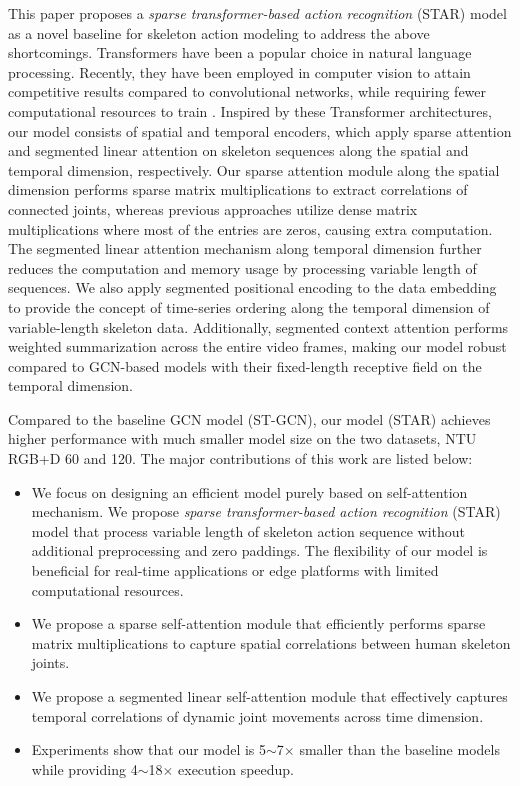 \documentclass[letterpaper]{article} %
\begin{document}
This paper proposes a \textit{sparse transformer-based action recognition} (STAR) model as a novel baseline for skeleton action modeling to address the above shortcomings. Transformers have been a popular choice in natural language processing. Recently, they have been employed in computer vision to attain competitive results compared to convolutional networks, while requiring fewer computational resources to train \cite{dosovitskiy2020image, huang2019ccnet}. Inspired by these Transformer architectures, our model consists of spatial and temporal encoders, which apply sparse attention and segmented linear attention on skeleton sequences along the spatial and temporal dimension, respectively.
Our sparse attention module along the spatial dimension performs sparse matrix multiplications to extract correlations of connected joints, whereas previous approaches utilize dense matrix multiplications where most of the entries are zeros, causing extra computation. The segmented linear attention mechanism along temporal dimension further reduces the computation and memory usage by processing variable length of sequences. We also apply segmented positional encoding to the data embedding to provide the concept of time-series ordering along the temporal dimension of variable-length skeleton data. Additionally, segmented context attention performs weighted summarization across the entire video frames, making our model robust compared to GCN-based models with their fixed-length receptive field on the temporal dimension.

Compared to the baseline GCN model (ST-GCN), our model (STAR) achieves higher performance with much smaller model size on the two datasets, NTU RGB+D 60 and 120. The major contributions of this work are listed below:
\begin{itemize}
    \item We focus on designing an efficient model purely based on self-attention mechanism. We propose \textit{sparse transformer-based action recognition} (STAR) model that process variable length of skeleton action sequence without additional preprocessing and zero paddings. The flexibility of our model is beneficial for real-time applications or edge platforms with limited computational resources.
    \item  We propose a sparse self-attention module that efficiently performs sparse matrix multiplications to capture spatial correlations between human skeleton joints.
    \item We propose a segmented linear self-attention module that effectively captures temporal correlations of dynamic joint movements across time dimension.
    \item Experiments show that our model is 5$\sim$7$\times$ smaller than the baseline models while providing 4$\sim$18$\times$ execution speedup.
\end{itemize}
\end{document}

